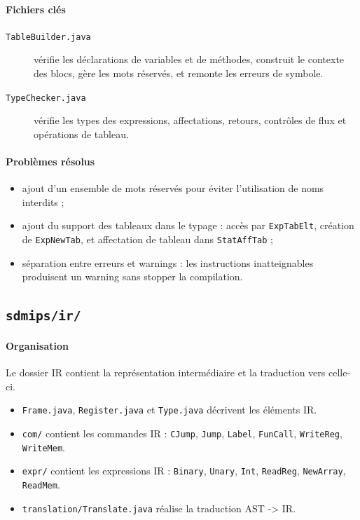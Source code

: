 \documentclass[a4paper,11pt]{article}
\begin{document}
\paragraph{Fichiers clés}
\begin{description}
  \item[\texttt{TableBuilder.java}] vérifie les déclarations de variables et de méthodes, construit le contexte des blocs, gère les mots réservés, et remonte les erreurs de symbole.
  \item[\texttt{TypeChecker.java}] vérifie les types des expressions, affectations, retours, contrôles de flux et opérations de tableau.
\end{description}

\paragraph{Problèmes résolus}
\begin{itemize}
  \item ajout d'un ensemble de mots réservés pour éviter l'utilisation de noms interdits ;
  \item ajout du support des tableaux dans le typage : accès par \texttt{ExpTabElt}, création de \texttt{ExpNewTab}, et affectation de tableau dans \texttt{StatAffTab} ;
  \item séparation entre erreurs et warnings : les instructions inatteignables produisent un warning sans stopper la compilation.
\end{itemize}

\subsection{\texttt{sdmips/ir/}}
\paragraph{Organisation}
Le dossier IR contient la représentation intermédiaire et la traduction vers celle-ci.
\begin{itemize}
  \item \texttt{Frame.java}, \texttt{Register.java} et \texttt{Type.java} décrivent les éléments IR.
  \item \texttt{com/} contient les commandes IR : \texttt{CJump}, \texttt{Jump}, \texttt{Label}, \texttt{FunCall}, \texttt{WriteReg}, \texttt{WriteMem}.
  \item \texttt{expr/} contient les expressions IR : \texttt{Binary}, \texttt{Unary}, \texttt{Int}, \texttt{ReadReg}, \texttt{NewArray}, \texttt{ReadMem}.
  \item \texttt{translation/Translate.java} réalise la traduction AST -> IR.
\end{itemize}
\end{document}
